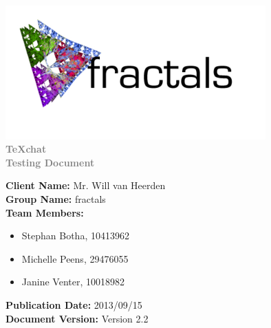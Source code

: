 \documentclass[11pt,a4paper]{moderncv}
\begin{document}
		\fontsize{36pt}{36pt}\selectfont
		\begin{center}
		\includegraphics[width=10cm]{./logo2.jpg}
			\textbf{\textcolor{gray}{\\TeXchat}}
			\textbf{\textcolor{gray}{\\Testing Document}}
		\vspace*{\fill}
		\end{center}
		
		\fontsize{12pt}{12pt}\selectfont
		\textbf{Client Name:} Mr. Will van Heerden\\
		\textbf{Group Name:} fractals\\
		\textbf{Team Members:}
			\begin{itemize}
				\item Stephan Botha, 10413962
				\item Michelle Peens, 29476055
				\item Janine Venter, 10018982	
			\end{itemize}
		\textbf{Publication Date:} 2013/09/15\\
		\textbf{Document Version:} Version 2.2
		
\end{document}
